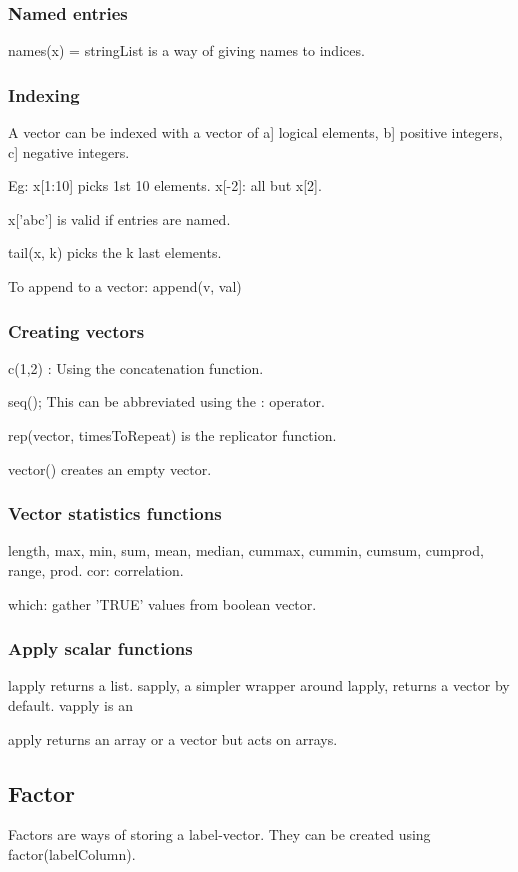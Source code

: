 \subsubsection{Named entries}
names(x) = stringList is a way of giving names to indices.

\subsubsection{Indexing}
A vector can be indexed with a vector of a] logical elements, b] positive integers, c] negative integers.

Eg: x[1:10] picks 1st 10 elements. x[-2]: all but x[2].

x['abc'] is valid if entries are named.

tail(x, k) picks the k last elements.

To append to a vector: append(v, val)

\subsubsection{Creating vectors}
c(1,2) : Using the concatenation function.

seq(); This can be abbreviated using the : operator.

rep(vector, timesToRepeat) is the replicator function.

vector() creates an empty vector.

\subsubsection{Vector statistics functions}
length, max, min, sum, mean, median, cummax, cummin, cumsum, cumprod, range, prod. cor: correlation.

which: gather 'TRUE' values from boolean vector.

\subsubsection{Apply scalar functions}
lapply returns a list. sapply, a simpler wrapper around lapply, returns a vector by default. vapply is an

apply returns an array or a vector but acts on arrays.

\subsection{Factor}
Factors are ways of storing a label-vector. They can be created using factor(labelColumn).

